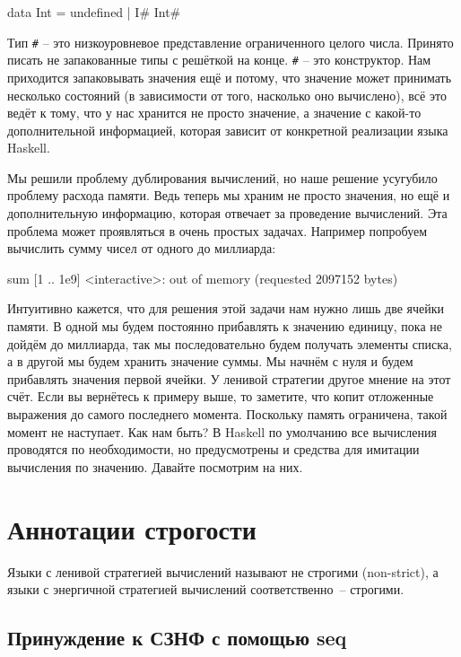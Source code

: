 \begin{code}
data Int = undefined  | I# Int# 
\end{code}

Тип \verb!#! -- это низкоуровневое представление 
ограниченного целого числа. Принято писать не запакованные
типы с решёткой на конце. \verb!#! -- это конструктор. 
Нам приходится запаковывать значения ещё и потому, что
значение может принимать несколько состояний (в зависимости
от того, насколько оно вычислено), всё это ведёт к тому,
что у нас хранится не просто значение, а значение
с какой-то дополнительной информацией, которая зависит
от конкретной реализации языка Haskell. 

Мы решили проблему дублирования вычислений, но наше решение 
усугубило проблему расхода памяти. Ведь теперь мы храним
не просто значения, но ещё и дополнительную информацию,
которая отвечает за проведение вычислений. 
Эта проблема может проявляться в очень простых задачах.
Например попробуем вычислить сумму чисел от одного до миллиарда:

\begin{code}
sum [1 .. 1e9]
<interactive>: out of memory (requested 2097152 bytes)
\end{code}

Интуитивно кажется, что для решения этой задачи нам нужно 
лишь две ячейки памяти. В одной мы будем постоянно прибавлять 
к значению единицу, пока не дойдём до миллиарда, так 
мы последовательно будем получать 
элементы списка, а в другой мы будем хранить значение суммы.
Мы начнём с нуля и будем прибавлять значения первой ячейки. 
У ленивой стратегии другое мнение на этот счёт.
Если вы вернётесь к примеру выше, то заметите, что 
 копит отложенные выражения до самого 
последнего момента. Поскольку память ограничена, такой 
момент не наступает. Как нам быть? В Haskell по умолчанию
все вычисления проводятся по необходимости, но
предусмотрены и средства для имитации вычисления по значению.
Давайте посмотрим на них.


\section{Аннотации строгости}

Языки с ленивой стратегией вычислений называют не строгими (non-strict),
а языки с энергичной стратегией вычислений соответственно~-- строгими.

\subsection{Принуждение к СЗНФ с помощью seq}

